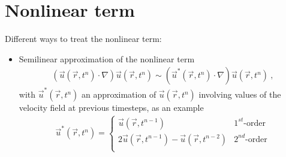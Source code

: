 \documentclass[letterpaper,10pt,english]{jupyterBook}
\begin{document}
\section{Non\sphinxhyphen{}linear term}
\label{\detokenize{ch/pde/ns:non-linear-term}}
\sphinxAtStartPar
Different ways to treat the non\sphinxhyphen{}linear term:
\begin{itemize}
\item {} 
\sphinxAtStartPar
Semi\sphinxhyphen{}linear approximation of the non\sphinxhyphen{}linear term
\begin{equation*}
\begin{split}( \vec{u}(\vec{r}, t^n) \cdot \nabla ) \vec{u}(\vec{r}, t^n) \sim ( \vec{u}^*(\vec{r}, t^n) \cdot \nabla ) \vec{u}(\vec{r}, t^n) \ , \end{split}
\end{equation*}
\sphinxAtStartPar
with \(\vec{u}^*(\vec{r}, t^n)\) an approximation of \(\vec{u}(\vec{r},t^n)\) involving values of the velocity field at previous time\sphinxhyphen{}steps, as an example
\begin{equation*}
\begin{split}\vec{u}^*(\vec{r}, t^n) = 
   \begin{cases}
      \vec{u}(\vec{r}, t^{n-1}) & \text{$1^{st}$-order} \\
      2 \vec{u}(\vec{r}, t^{n-1}) - \vec{u}(\vec{r}, t^{n-2}) & \text{$2^{nd}$-order} \\
   \end{cases}\end{split}
\end{equation*}
\end{itemize}

\sphinxstepscope
\end{document}
